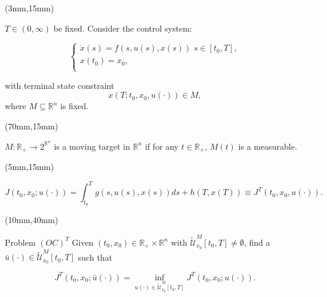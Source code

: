 \documentclass[10pt]{beamer}
\begin{document}
%
%
\begin{frame}

\begin{textblock*}{65mm}(3mm,15mm)
	\begin{greenbox}{}
		$T\in (0,\infty)$ be fixed. Consider the control system:

		$$\left\{ \begin{array}{l}
		\dot{x}(s)=f(s,u(s),x(s))\,\,s\in [t_0,T], \\
		x(t_0)=x_0,\\
		\end{array}
		\right.$$

		with terminal state constraint
		$$x(T;t_0,x_0,u(\cdot))\in M,$$
		where $M\subseteq \mathbb{R}^n$ is fixed.
	\end{greenbox}
\end{textblock*}

\begin{textblock*}{55mm}(70mm,15mm)
	\begin{yellowbox}{}
		$M:\mathbb{R}_{+}\rightarrow 2^{\mathbb{R}^n}$ is a moving target in $\mathbb{R}^n$ if for any $t\in \mathbb{R}_{+}$, $M(t)$ is a measurable.
	\end{yellowbox}
\end{textblock*}

\end{frame}


\begin{frame}
	\begin{textblock*}{120mm}(5mm,15mm)
		\begin{yellowbox}{}
			$$J(t_0,x_0;u(\cdot))=\int_{t_0}^{T}g(s,u(s),x(s))ds+h(T,x(T))\equiv J^T(t_0,x_0,u(\cdot)).$$
		\end{yellowbox}
	\end{textblock*}
	\begin{textblock*}{110mm}(10mm,40mm)
		\begin{graybox}{Problem $(OC)^T$}
			Given $(t_0,x_0)\in \mathbb{R}_{+}\times \mathbb{R}^n$ with $\tilde{\mathcal{U}}^M_{x_0}[t_0,T]\neq\emptyset$, find a $\bar{u}(\cdot)\in \tilde{\mathcal{U}}^M_{x_0}[t_0,T]$ such that
			
			\begin{equation*}
			J^T(t_0,x_0;\bar{u}(\cdot))=\inf_{u(\cdot)\in \tilde{\mathcal{U}}^M_{x_0}[t_0,T]} J^T(t_0,x_0;u(\cdot)).
			\end{equation*}
		
		\end{graybox}
	\end{textblock*}
\end{frame}
\end{document}
